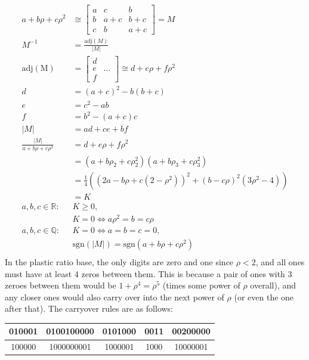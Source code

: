 \documentclass{article}
\begin{document}
\begin{align*}
  a+b\rho+c\rho^2 &\cong
  \begin{bmatrix}
    a & c & b \\
    b & a+c & b+c \\
    c & b & a+c
  \end{bmatrix} = M \\
  M^{-1} &= \frac{\mathrm{adj}(M)}{\lvert M \rvert} \\
  \mathrm{adj(M)} &=
  \begin{bmatrix}
    d & \\
    e & \hdots \\
    f &
  \end{bmatrix}
  \cong d+e\rho+f\rho^2 \\
  d &=
  (a+c)^2-b(b+c) \\
  e &=
  c^2-ab \\
  f &=
  b^2-(a+c)c \\
  \lvert M \rvert &= ad+ce+bf \\
  \frac{\lvert M \rvert}{a+b\rho+c\rho^2}
  &= d+e\rho+f\rho^2 \\
  &= (a+b\rho_2+c\rho_2^2)(a+b\rho_3+c\rho_3^2) \\
  &= \frac{1}{4}\left((2a-b\rho+c(2-\rho^2))^2+(b-c\rho)^2(3\rho^2-4)\right) \\
  &= K \\
  a, b, c \in \mathbb{R}: & K \geq 0, \\
  & K = 0 \iff a\rho^2 = b = c\rho \\
  a, b, c \in \mathbb{Q}: & K = 0 \iff a = b = c = 0, \\
  & \mathrm{sgn}(\lvert M \rvert) = \mathrm{sgn}(a+b\rho+c\rho^2) \\
\end{align*}
In the plastic ratio base,
the only digits are zero and one since $\rho < 2$,
and all ones must have at least 4 zeros between them.
This is because a pair of ones with 3 zeroes between them
would be $1+\rho^4=\rho^5$ (times some power of $\rho$ overall),
and any closer ones would also carry over into the next power of $\rho$
(or even the one after that).
The carryover rules are as follows:
\begin{center}
  \begin{tabular}{|c|c|c|c|c|}
    \hline
    010001 & 0100100000 & 0101000 & 0011 & 00200000 \\ \hline
    100000 & 1000000001 & 1000001 & 1000 & 10000001 \\ \hline  
  \end{tabular}
\end{center}
\end{document}
